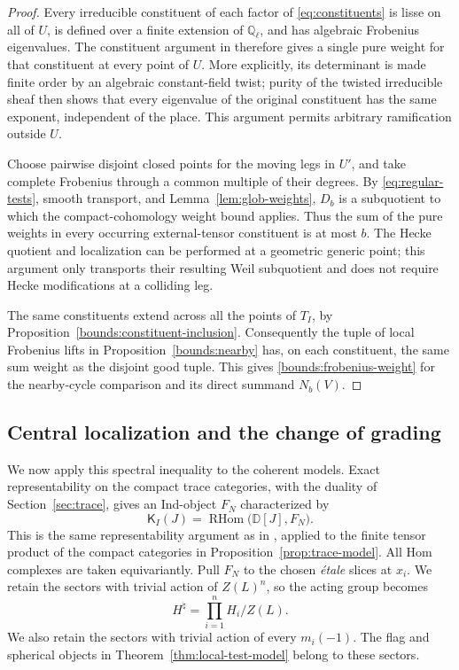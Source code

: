 \documentclass[11pt]{article}
\numberwithin{equation}{section}
\theoremstyle{definition}
\theoremstyle{remark}
\newcommand{\Q}{\mathbb Q}
\newcommand{\RHom}{\operatorname{RHom}}
\begin{document}
\begin{proof}
Every irreducible constituent of each factor of
\eqref{eq:constituents} is lisse on all of $U$, is defined over a
finite extension of $\Q_\ell$, and has algebraic Frobenius
eigenvalues.  The constituent argument in
\cite[Lemma~6.4]{Parent}
therefore gives a single pure weight for that constituent at every
point of $U$.  More explicitly, its determinant is made finite order
by an algebraic constant-field twist; purity of the twisted
irreducible sheaf then shows that every eigenvalue of the original
constituent has the same exponent, independent of the place.  This
argument permits arbitrary ramification outside $U$.

Choose pairwise disjoint closed points for the moving legs in $U'$,
and take complete Frobenius through a common multiple of their
degrees.  By \eqref{eq:regular-tests}, smooth transport, and
Lemma~\ref{lem:glob-weights}, $D_b$ is a subquotient to which the
compact-cohomology weight bound applies.  Thus the sum of the pure
weights in every occurring external-tensor constituent is at most
$b$.  The Hecke quotient and localization can be performed at a
geometric generic point; this argument only transports their
resulting Weil subquotient and does not require Hecke modifications
at a colliding leg.

The same constituents extend across all the points of $T_I$, by
Proposition~\ref{bounds:constituent-inclusion}.  Consequently the
tuple of local Frobenius lifts in Proposition~\ref{bounds:nearby}
has, on each constituent, the same sum weight as the disjoint good
tuple.  This gives \eqref{bounds:frobenius-weight} for the nearby-cycle
comparison and its direct summand $N_b(V)$.
\end{proof}

\subsection{Central localization and the change of grading}

We now apply this spectral inequality to the coherent models.  Exact
representability on the compact trace categories, with the duality of
Section~\ref{sec:trace}, gives an Ind-object $F_N$ characterized by
\begin{equation}
 \mathsf K_I(J)=\RHom\bigl(\mathbb D[J],F_N\bigr).
 \label{eq:global-functional}
\end{equation}
This is the same representability argument as in
\cite[proof of Proposition~2.7]{Parent}, applied to the finite tensor product of the
compact categories in Proposition~\ref{prop:trace-model}.  All Hom
complexes are taken equivariantly.  Pull $F_N$ to the chosen \emph{\'etale}
slices at $x_i$.  We retain the sectors with trivial action of
$Z(L)^n$, so the acting group becomes
\[
 H^\natural=\prod_{i=1}^n H_i/Z(L).
\]
We also retain the sectors with trivial action of every $m_i(-1)$.
The flag and spherical objects in Theorem~\ref{thm:local-test-model}
belong to these sectors.
\end{document}
